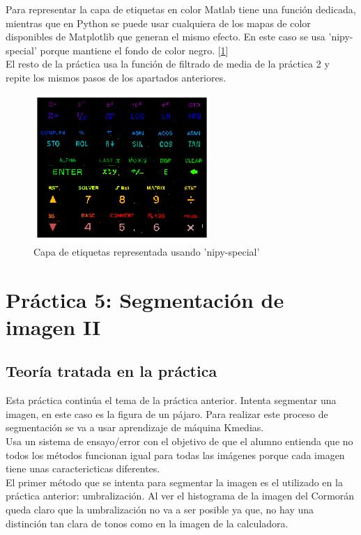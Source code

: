 \documentclass[a4paper,12pt]{report}
\begin{document}
Para representar la capa de etiquetas en color Matlab tiene una función dedicada, mientras que en Python se puede usar cualquiera de los mapas de color disponibles de Matplotlib que generan el mismo efecto. En este caso se usa 'nipy-special' porque mantiene el fondo de color negro. [\ref{color}]\\

El resto de la práctica usa la función de filtrado de media de la práctica 2 y repite los mismos pasos de los apartados anteriores.

\begin{figure}[h]
\centering
\includegraphics[width=0.6\textwidth]{imagenes/color}
\caption{Capa de etiquetas representada usando 'nipy-special'}
\label{color}
\end{figure}


\section{ Práctica 5: Segmentación de imagen II}
\subsection{Teoría tratada en la práctica}

Esta práctica continúa el tema de la práctica anterior. Intenta segmentar una imagen, en este caso es la figura de un pájaro. Para realizar este proceso de segmentación se va a usar aprendizaje de máquina Kmedias.\\

Usa un sistema de ensayo/error con el objetivo de que el alumno entienda que no todos los métodos funcionan igual para todas las imágenes porque cada imagen tiene unas caractericticas diferentes.\\

El primer método que se intenta para segmentar la imagen es el utilizado en la práctica anterior: umbralización. Al ver el histograma de la imagen del Cormorán queda claro que la umbralización no va a ser posible ya que, no hay una distinción tan clara de tonos como en la imagen de la calculadora.\\
\end{document}
